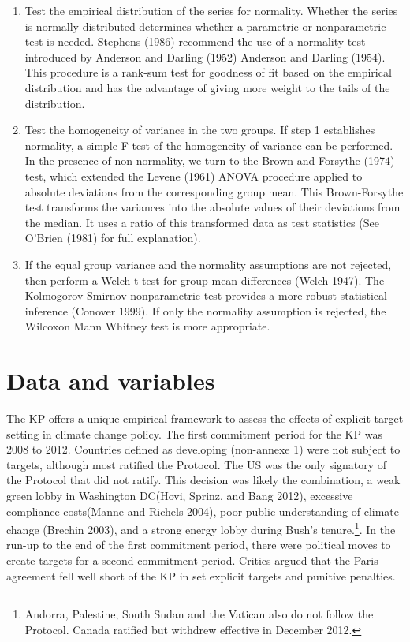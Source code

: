 \documentclass[
  10pt,
]{article}
\begin{document}
\begin{enumerate}
\def\labelenumi{\arabic{enumi}.}
\item
  Test the empirical distribution of the series for normality. Whether
  the series is normally distributed determines whether a parametric or
  nonparametric test is needed. Stephens (1986) recommend the use of a
  normality test introduced by Anderson and Darling (1952) Anderson and
  Darling (1954). This procedure is a rank-sum test for goodness of fit
  based on the empirical distribution and has the advantage of giving
  more weight to the tails of the distribution.
\item
  Test the homogeneity of variance in the two groups. If step 1
  establishes normality, a simple F test of the homogeneity of variance
  can be performed. In the presence of non-normality, we turn to the
  Brown and Forsythe (1974) test, which extended the Levene (1961) ANOVA
  procedure applied to absolute deviations from the corresponding group
  mean. This Brown-Forsythe test transforms the variances into the
  absolute values of their deviations from the median. It uses a ratio
  of this transformed data as test statistics (See O'Brien (1981) for
  full explanation).
\item
  If the equal group variance and the normality assumptions are not
  rejected, then perform a Welch t-test for group mean differences
  (Welch 1947). The Kolmogorov-Smirnov nonparametric test provides a
  more robust statistical inference (Conover 1999). If only the
  normality assumption is rejected, the Wilcoxon Mann Whitney test is
  more appropriate.
\end{enumerate}

\hypertarget{data-and-variables}{%
\section{Data and variables}\label{data-and-variables}}

The KP offers a unique empirical framework to assess the effects of
explicit target setting in climate change policy. The first commitment
period for the KP was 2008 to 2012. Countries defined as developing
(non-annexe 1) were not subject to targets, although most ratified the
Protocol. The US was the only signatory of the Protocol that did not
ratify. This decision was likely the combination, a weak green lobby in
Washington DC(Hovi, Sprinz, and Bang 2012), excessive compliance
costs(Manne and Richels 2004), poor public understanding of climate
change (Brechin 2003), and a strong energy lobby during Bush's
tenure.\footnote{Andorra, Palestine, South Sudan and the Vatican also do
  not follow the Protocol. Canada ratified but withdrew effective in
  December 2012.}. In the run-up to the end of the first commitment
period, there were political moves to create targets for a second
commitment period. Critics argued that the Paris agreement fell well
short of the KP in set explicit targets and punitive penalties.
\end{document}
